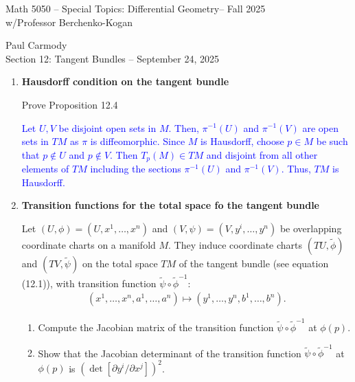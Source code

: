 \documentclass[12pt,a4paper]{report}
\newcommand{\CLASSNAME}{Math 5050 -- Special Topics: Differential Geometry}
\newcommand{\STUDENTNAME}{Paul Carmody}
\newcommand{\ASSIGNMENT}{Section 12: Tangent Bundles }
\newcommand{\DUEDATE}{September 24, 2025}
\newcommand{\PROFESSOR}{Professor Berchenko-Kogan}
\newcommand{\SEMESTER}{Fall 2025}
\newcommand{\BLUE}[1]{\textcolor{blue}{#1}}
\begin{document}
\begin{center}
	\Large{\CLASSNAME -- \SEMESTER} \\
	\large{ w/\PROFESSOR}
\end{center}
\begin{center}
	\STUDENTNAME \\
	\ASSIGNMENT -- \DUEDATE\\
\end{center} 


\begin{enumerate}[label=12.\arabic*]

\item \textbf{Hausdorff condition on the tangent bundle}

Prove Proposition 12.4

\BLUE{Let $U, V$ be disjoint open sets in $M$. Then, $\pi^{-1}(U)$ and $\pi^{-1}(V)$ are open sets in $TM$ as $\pi$ is diffeomorphic.  Since $M$ is Hausdorff, choose $p \in M$ be such that $p \not \in U$ and $p \not \in V$.   Then $T_p(M) \in TM$ and disjoint from all other elements of $TM$ including the sections $\pi^{-1}(U)$ and $\pi^{-1}(V)$.  Thus, $TM$ is Hausdorff.
}

\item \textbf{Transition functions for the total space fo the tangent bundle}

Let $(U,\phi)= (U, x^1, \dots, x^n)$ and $(V, \psi) = (V, y^i, \dots, y^n)$ be overlapping coordinate charts on a manifold $M$.  They induce coordinate charts $(TU, \tilde{\phi})$ and $(TV, \tilde{\psi})$ on the total space $TM$ of the tangent bundle (see equation (12.1)), with transition function $\tilde{\psi}\circ\tilde{\phi}^{-1}$:
\begin{align*}
	(x^1,\dots, x^n, a^1,\dots, a^n)\mapsto(y^1,\dots, y^n, b^1, \dots, b^n).
\end{align*}\begin{enumerate}[label=(\alph*)]
	\item Compute the Jacobian matrix of the transition function $\tilde{\psi}\circ\tilde{\phi}^{-1}$ at $\phi(p)$.
	
	\item Show that the Jacobian determinant of the transition function $\tilde{\psi}\circ\tilde{\phi}^{-1}$ at $\phi(p)$ is $(\det[\partial y^i/\partial x^j])^2$.
	

\end{enumerate}
\end{enumerate}
\end{document}
